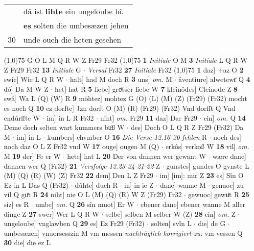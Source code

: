 \documentclass[8pt,a4paper,notitlepage]{article}
\begin{document}
\begin{table}[ht]
\begin{minipage}[t]{0.5\linewidth}
\begin{tabular}{rl}
 & dâ ist \textbf{lîhte} ein ungeloube bî.\\ 
 & \textbf{es} solten die umbesæzen jehen\\ 
30 & unde ouch die heten gesehen\\ 
\end{tabular}
\scriptsize
\line(1,0){75} \newline
G O L M Q R W Z Fr29 Fr32 \newline
\line(1,0){75} \newline
\textbf{1} \textit{Initiale} O M  \textbf{3} \textit{Initiale} L Q R W Z Fr29 Fr32  \textbf{13} \textit{Initiale} G   $\cdot$ \textit{Versal} Fr32  \textbf{27} \textit{Initiale} Fr32  \newline
\line(1,0){75} \newline
\textbf{1} daz] ÷az O \textbf{2} swie] Wie L Q R W  $\cdot$ halt] had M doch R \textbf{3} uns] \textit{om.} M  $\cdot$ âventiure] alwetewr͑ Q \textbf{4} dô] Da M W Z  $\cdot$ het] hat R \textbf{5} liebe] groͤsser liebe W \textbf{7} kleinôdes] Cleinode Z \textbf{8} swâ] Wa L (Q) (W) R \textbf{9} möhtez] mohtez G (O) (L) (M) (Z) (Fr29) (Fr32) mocht es noch Q \textbf{10} ez dorfte] Jzn dorft O (M) (R) (Fr29) (Fr32) Vnd dorfft Q Vnd endúrffte W  $\cdot$ im] in L R Fr32  $\cdot$ niht] \textit{om.} Fr29 \textbf{11} daz] Dar Fr29  $\cdot$ ein] \textit{om.} Q \textbf{14} Deme doch selten wart kummers buͦß W  $\cdot$ des] Doch O L Q R Z Fr29 (Fr32) Da M  $\cdot$ im] in L  $\cdot$ kumbers] chvmber O \textbf{16} \textit{Die Verse 12.16-20 fehlen} R   $\cdot$ noch des] noch daz O L Z Fr32 vnd W \textbf{17} ouge] ougen M (Q)  $\cdot$ erkôs] verkoß W \textbf{18} vil] \textit{om.} M \textbf{19} der] Fe er W  $\cdot$ hete] hat L \textbf{20} Der von dannen wer gewant W  $\cdot$ wære dane] dannen wer Q (Fr32) \textbf{21} \textit{Versfolge 12.23-24-21-22} Z   $\cdot$ gunstes] gundes O gvnste L (M) (Q) (R) (W) (Z) Fr32 \textbf{22} dem] Den L Z Fr29  $\cdot$ im] [im]: mir Z \textbf{23} es] Sîn O Ez in L Das Q (Fr32)  $\cdot$ dûhte] duch R  $\cdot$ in] in ie Z  $\cdot$ dane] wanne M  $\cdot$ genuoc] zu vil Q guͦt R \textbf{24} niht] nie O L (M) (Q) (R) W Z (Fr29) Fr32  $\cdot$ gewuoc] gewuͦt R \textbf{25} siz] es R  $\cdot$ umbe] \textit{om.} Q \textbf{26} sîn muot] Er W  $\cdot$ ebener dane] ebener wanne M aller dinge Z \textbf{27} swer] Wer L Q R W  $\cdot$ selbe] selben M selber W (Z) \textbf{28} ein] \textit{om.} Z  $\cdot$ ungeloube] vnglawben Q \textbf{29} es] Ez Fr29 (Fr32)  $\cdot$ solten] svln L  $\cdot$ die] de G  $\cdot$ umbesæzen] vnuorsesszin M vm messen \textit{nachträglich korrigiert zu:} vm vessen Q \textbf{30} die] die ez L \newline

\end{minipage}
\end{table}
\end{document}
